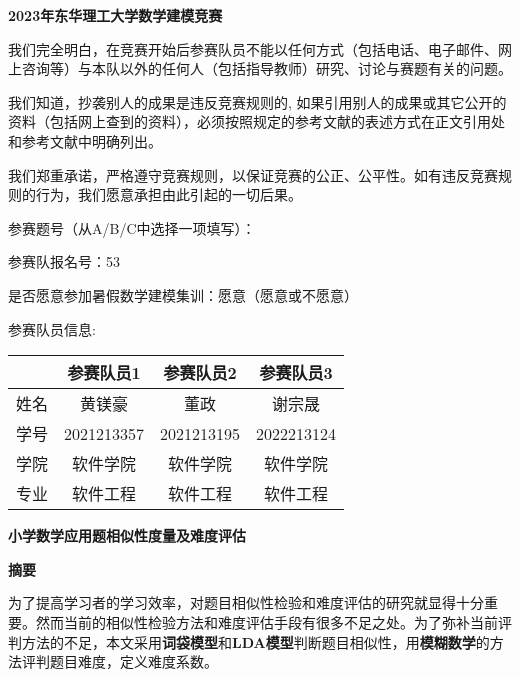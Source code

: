 \thispagestyle{empty}   %

\begin{center}
    \textbf{\fontsize{30}{1.5} 2023年东华理工大学数学建模竞赛}
\end{center}

我们完全明白，在竞赛开始后参赛队员不能以任何方式（包括电话、电子邮件、网上咨询等）与本队以外的任何人（包括指导教师）研究、讨论与赛题有关的问题。

我们知道，抄袭别人的成果是违反竞赛规则的, 如果引用别人的成果或其它公开的资料（包括网上查到的资料），必须按照规定的参考文献的表述方式在正文引用处和参考文献中明确列出。

我们郑重承诺，严格遵守竞赛规则，以保证竞赛的公正、公平性。如有违反竞赛规则的行为，我们愿意承担由此引起的一切后果。

参赛题号（从A/B/C中选择一项填写）：

参赛队报名号：53

是否愿意参加暑假数学建模集训：愿意（愿意或不愿意）\newline


{\fontsize{20}{2}参赛队员信息:}

\begin{table}[h]
    \centering
    \begin{tabular}{|c|c|c|c|}
    \hline
       & 参赛队员1      & 参赛队员2      & 参赛队员3      \\ \hline
    姓名 & 黄镁豪        & 董政         & 谢宗晟        \\ \hline
    学号 & 2021213357 & 2021213195 & 2022213124 \\ \hline
    学院 & 软件学院       & 软件学院       & 软件学院       \\ \hline
    专业 & 软件工程       & 软件工程       & 软件工程       \\ \hline
    \end{tabular}
\end{table}

%
%

\newpage
\thispagestyle{empty}

\begin{center}
    \textbf{\fontsize{20}{1.5}小学数学应用题相似性度量及难度评估}

    \textbf{摘要}
\end{center}

为了提高学习者的学习效率，对题目相似性检验和难度评估的研究就显得十分重要。然而当前的相似性检验方法和难度评估手段有很多不足之处。为了弥补当前评判方法的不足，本文采用\textbf{词袋模型}和\textbf{LDA模型}判断题目相似性，用\textbf{模糊数学}的方法评判题目难度，定义难度系数。

